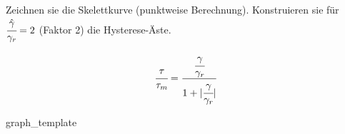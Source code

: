 \begin{questions}
\vspace{1em}
    \begin{tasks}
        \task[] Zeichnen sie die Skelettkurve (punktweise Berechnung).
        \task[] Konstruieren sie für $\cfrac{\hat \gamma}{\gamma_r}=2$ (Faktor 2) die Hysterese-Äste.
    \end{tasks}

    \begin{align*}
        \cfrac{\tau}{\tau_m} = \cfrac{\cfrac{\gamma}{\gamma_r}}{1+|\cfrac{\gamma}{\gamma_r}|}
    \end{align*}

    graph\_template


    \begin{solution}

        

    \end{solution}
    
\end{questions}
